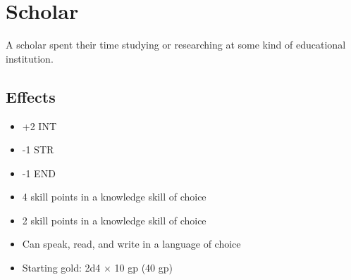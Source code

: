 \section{Scholar}\label{background:scholar}
A scholar spent their time studying or researching at some kind of educational
institution.

\subsection*{Effects}
\begin{itemize}
    \item +2 INT
    \item -1 STR
    \item -1 END
    \item 4 skill points in a knowledge skill of choice
    \item 2 skill points in a knowledge skill of choice
    \item Can speak, read, and write in a language of choice
    \item Starting gold: 2d4 $\times$ 10 gp (40 gp)
\end{itemize}
